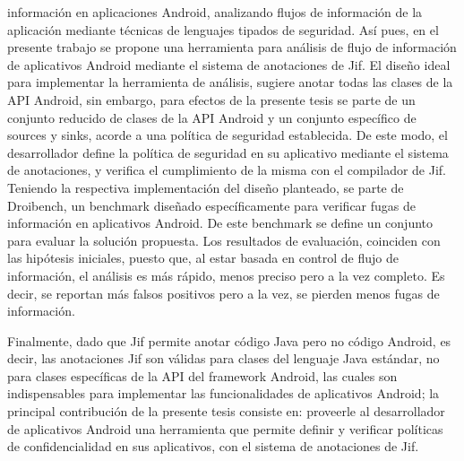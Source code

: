 información en aplicaciones Android, analizando flujos de información de la
aplicación mediante técnicas de lenguajes tipados de seguridad.\newline 
Así pues, en el presente trabajo se propone una herramienta para análisis de
flujo de información de aplicativos Android mediante el sistema de anotaciones
de Jif.\newline 
El diseño ideal para implementar la herramienta de análisis, sugiere anotar
todas las clases de la API Android, sin embargo, para efectos de la presente
tesis se parte de un conjunto reducido de clases de la API Android y un conjunto
específico de sources y sinks, acorde a una política de seguridad establecida. 
De este modo, el desarrollador define la política de seguridad en su aplicativo
mediante el sistema de anotaciones, y verifica el cumplimiento de la misma con
el compilador de Jif.\newline 
Teniendo la respectiva implementación del diseño planteado, se parte de
Droibench, un benchmark diseñado específicamente para verificar fugas de
información en aplicativos Android. De este benchmark se define un conjunto para
evaluar la solución propuesta. Los resultados de evaluación, coinciden con las
hipótesis iniciales, puesto que, al estar basada en control de flujo de
información, el análisis es más rápido, menos preciso pero a la vez completo. Es
decir, se reportan más falsos positivos pero a la vez, se pierden menos fugas de
información.

Finalmente, dado que Jif permite
anotar código Java pero no código Android, es decir, las anotaciones Jif son
válidas para clases del lenguaje Java estándar, no para clases específicas de la
API del framework Android, las cuales son indispensables para
implementar las funcionalidades de aplicativos Android; la principal
contribución de la presente tesis consiste en: proveerle al desarrollador de
aplicativos Android una herramienta que permite definir y verificar políticas de
confidencialidad en sus aplicativos, con el sistema de anotaciones de
Jif.\newline


